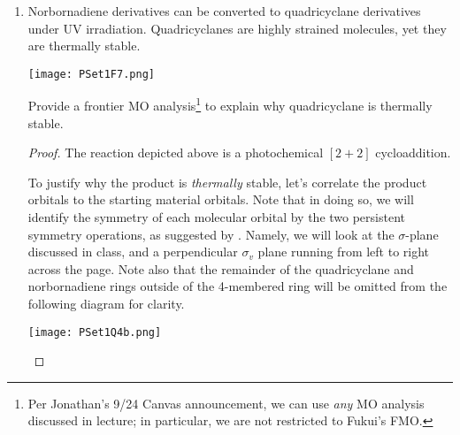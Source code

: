 \documentclass[../psets.tex]{subfiles}
\begin{document}
\begin{enumerate}
\begin{enumerate}
\begin{proof}
            Norbornene has two $p$-AOs that mix into two $\pi$-MOs: One bonding and one antibonding.\par
            Norbornadiene has two pairs of these $\pi$-MOs that can then weakly re-mix through space across the molecule to form four new MOs.\par
            After mixing, the second-lowest of these MOs (the new HOMO) will be higher in energy than the unmixed original $\pi$-MO (the old HOMO and, coincidentally, norbornene's HOMO). Essentially, this through-space mixing causes norbornadiene to have a higher HOMO than norbornene. As discussed in Q1c, species with a higher HOMO are more nucleophilic, and hence more reactive toward electrophiles.
            \begin{center}
                \texttt{[image: PSet1Q4a.png]}
            \end{center}
        \end{proof}
        \item Norbornadiene derivatives can be converted to quadricyclane derivatives under UV irradiation. Quadricyclanes are highly strained molecules, yet they are thermally stable.
        \begin{center}
            \texttt{[image: PSet1F7.png]}
        \end{center}
        Provide a frontier MO analysis\footnote{Per Jonathan's 9/24 Canvas announcement, we can use \emph{any} MO analysis discussed in lecture; in particular, we are not restricted to Fukui's FMO.} to explain why quadricyclane is thermally stable.
        \begin{proof}
            The reaction depicted above is a photochemical $[2+2]$ cycloaddition.\par
            To justify why the product is \emph{thermally} stable, let's correlate the product orbitals to the starting material orbitals. Note that in doing so, we will identify the symmetry of each molecular orbital by the two persistent symmetry operations, as suggested by \textcite[880]{bib:Anslyn}. Namely, we will look at the $\sigma$-plane discussed in class, and a perpendicular $\sigma_v$ plane running from left to right across the page. Note also that the remainder of the quadricyclane and norbornadiene rings outside of the 4-membered ring will be omitted from the following diagram for clarity.
            \begin{center}
                \texttt{[image: PSet1Q4b.png]}
            \end{center}

\end{proof}
\end{enumerate}
\end{enumerate}
\end{document}
